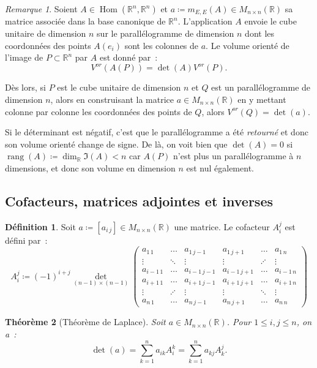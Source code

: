 \documentclass{article}
\DeclareMathOperator{\rang}{rang}
\DeclareMathOperator{\Hom}{Hom}
\newcommand{\R}{\mathbb R}
\newcommand{\M}[3]{M_{#1 \times #2}(#3)}
\newcommand{\Vor}{V^{or}}
\newtheorem{thm}{Théorème}[section]
\theoremstyle{definition}
\newtheorem{déf}[thm]{Définition}
\theoremstyle{remark}
\newtheorem*{rmq}{Remarque}
\begin{document}
		\begin{rmq} Soient $A \in \Hom(\R^n, \R^n)$ et $a \coloneqq m_{E, E}(A) \in \M nn\R$ sa matrice associée dans la base canonique de $\R^n$. L'application $A$
		envoie le cube unitaire de dimension $n$ sur le parallélogramme de dimension $n$ dont les coordonnées des points $A(e_i)$ sont les colonnes de $a$.
		Le volume orienté de l'image de $P \subset \R^n$ par $A$ est donné par~: \[\Vor(A(P)) = \det(A)\Vor(P).\]

		Dès lors, si $P$ est le cube unitaire de dimension $n$ et $Q$ est un parallélogramme de dimension $n$, alors en construisant la matrice $a \in \M nn\R$ en
		y mettant colonne par colonne les coordonnées des points de $Q$, alors $\Vor(Q) = \det(a)$.

		Si le déterminant est négatif, c'est que le parallélogramme a été \textit{retourné} et donc son volume orienté change de signe.
		De là, on voit bien que $\det(A) = 0$ si $\rang(A) \coloneqq \dim_\R\Im(A) < n$ car $A(P)$ n'est plus un parallélogramme à $n$ dimensions, et donc son volume en
		dimension $n$ est nul également. \end{rmq}

	\subsection{Cofacteurs, matrices adjointes et inverses}
		\begin{déf} Soit $a \coloneqq [a_{i\,j}] \in \M nn\R$ une matrice. Le cofacteur $A_i^j$ est défini par~:
		\[A_i^j \coloneqq (-1)^{i+j}\det_{(n-1)\times(n-1)}
		\begin{pmatrix}
			a_{1\,1}   & \ldots  & a_{1\,j-1}   & a_{1\,j+1}   & \ldots  & a_{1\,n}   \\
			  \vdots   & \ddots  &    \vdots    &   \vdots     & \iddots & \vdots     \\
			a_{i-1\,1} & \ldots  & a_{i-1\,j-1} & a_{i-1\,j+1} & \ldots  & a_{i-1\,n} \\
			a_{i+1\,1} & \ldots  & a_{i+1\,j-1} & a_{i+1\,j+1} & \ldots  & a_{i+1\,n} \\
			  \vdots   & \iddots &     \vdots   &    \vdots    & \ddots  & \vdots     \\
			a_{n\,1}   & \ldots  & a_{n\,j-1}   & a_{n\,j+1}   & \ldots  & a_{n\,n}
		\end{pmatrix}
		\] \end{déf}

		\begin{thm}[Théorème de Laplace]\label{thmLaplace} Soit $a \in \M nn\R$. Pour $1 \leq i, j \leq n$, on a~:
		\[\det(a) = \sum_{k=1}^na_{ik}A_i^k = \sum_{k=1}^na_{kj}A_k^j.\] \end{thm}
\end{document}
